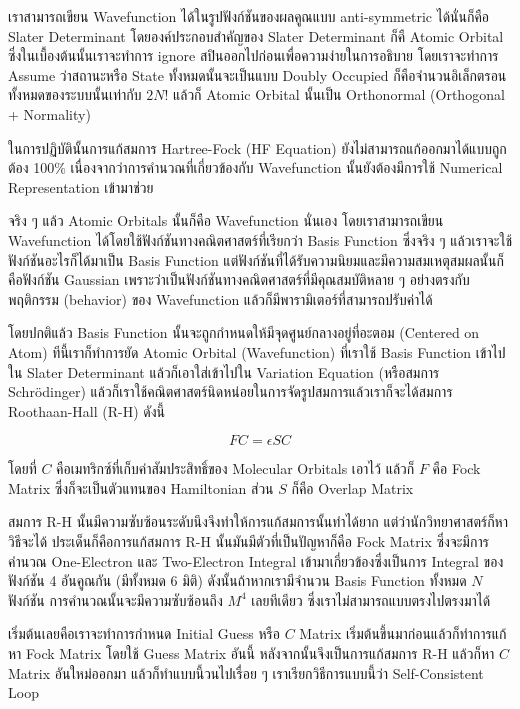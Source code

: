 เราสามารถเขียน Wavefunction ได้ในรูปฟังก์ชันของผลคูณแบบ anti-symmetric ได้นั่นก็คือ Slater Determinant
โดยองค์ประกอบสำคัญของ Slater Determinant ก็คื Atomic Orbital ซึ่งในเบื้องต้นนั้นเราจะทำการ ignore
สปินออกไปก่อนเพื่อความง่ายในการอธิบาย โดยเราจะทำการ Assume ว่าสถานะหรือ State ทั้งหมดนั้นจะเป็นแบบ
Doubly Occupied ก็คือจำนวนอิเล็กตรอนทั้งหมดของระบบนั้นเท่ากับ $2N!$ แล้วก็ Atomic Orbital
นั้นเป็น Orthonormal (Orthogonal + Normality)

ในการปฏิบัตินั้นการแก้สมการ Hartree-Fock (HF Equation) ยังไม่สามารถแก้ออกมาได้แบบถูกต้อง 100\%
เนื่องจากว่าการคำนวณที่เกี่ยวข้องกับ Wavefunction นั้นยังต้องมีการใช้ Numerical Representation เข้ามาช่วย

จริง ๆ แล้ว Atomic Orbitals นั้นก็คือ Wavefunction นั่นเอง โดยเราสามารถเขียน Wavefunction
ได้โดยใช้ฟังก์ชันทางคณิตศาสตร์ที่เรียกว่า Basis Function ซึ่งจริง ๆ แล้วเราจะใช้ฟังก์ชันอะไรก็ได้มาเป็น
Basis Function แต่ฟังก์ชันที่ได้รับความนิยมและมีความสมเหตุสมผลนั้นก็คือฟังก์ชัน Gaussian
เพราะว่าเป็นฟังก์ชันทางคณิตศาสตร์ที่มีคุณสมบัติหลาย ๆ อย่างตรงกับพฤติกรรม (behavior) ของ Wavefunction
แล้วก็มีพารามิเตอร์ที่สามารถปรับค่าได้

โดยปกติแล้ว Basis Function นั้นจะถูกกำหนดให้มีจุดศูนย์กลางอยู่ที่อะตอม (Centered on Atom)
ทีนี้เราก็ทำการยัด Atomic Orbital (Wavefunction) ที่เราใช้ Basis Function เข้าไปใน Slater
Determinant แล้วก็เอาใส่เข้าไปใน Variation Equation (หรือสมการ Schr\"{o}dinger)
แล้วก็เราใช้คณิตศาสตร์นิดหน่อยในการจัดรูปสมการแล้วเราก็จะได้สมการ Roothaan-Hall (R-H) ดังนี้

\begin{equation}
    FC = \epsilon SC
\end{equation}

โดยที่ $C$ คือเมทริกซ์ที่เก็บค่าสัมประสิทธิ์ของ Molecular Orbitals เอาไว้ แล้วก็ $F$ คือ Fock Matrix
ซึ่งก็จะเป็นตัวแทนของ Hamiltonian ส่วน $S$ ก็คือ Overlap Matrix

สมการ R-H นั้นมีความซับซ้อนระดับนึงจึงทำให้การแก้สมการนั้นทำได้ยาก แต่ว่านักวิทยาศาสตร์ก็หาวิธีจะได้
ประเด็นก็คือการแก้สมการ R-H นั้นมันมีตัวที่เป็นปัญหาก็คือ Fock Matrix ซึ่งจะมีการคำนวณ One-Electron
และ Two-Electron Integral เข้ามาเกี่ยวข้องซึ่งเป็นการ Integral ของฟังก์ชัน 4 อันคูณกัน
(มีทั้งหมด 6 มิติ) ดังนั้นถ้าหากเรามีจำนวน Basis Function ทั้งหมด $N$ ฟังก์ชัน
การคำนวณนั้นจะมีความซับซ้อนถึง $M^{4}$ เลยทีเดียว ซึ่งเราไม่สามารถแบบตรงไปตรงมาได้

เริ่มต้นเลยคือเราจะทำการกำหนด Initial Guess หรือ $C$ Matrix เริ่มต้นขึ้นมาก่อนแล้วก็ทำการแก้หา
Fock Matrix โดยใช้ Guess Matrix อันนี้ หลังจากนั้นจึงเป็นการแก้สมการ R-H แล้วก็หา $C$ Matrix
อันใหม่ออกมา แล้วก็ทำแบบนี้วนไปเรื่อย ๆ เราเรียกวิธีการแบบนี้ว่า Self-Consistent Loop

